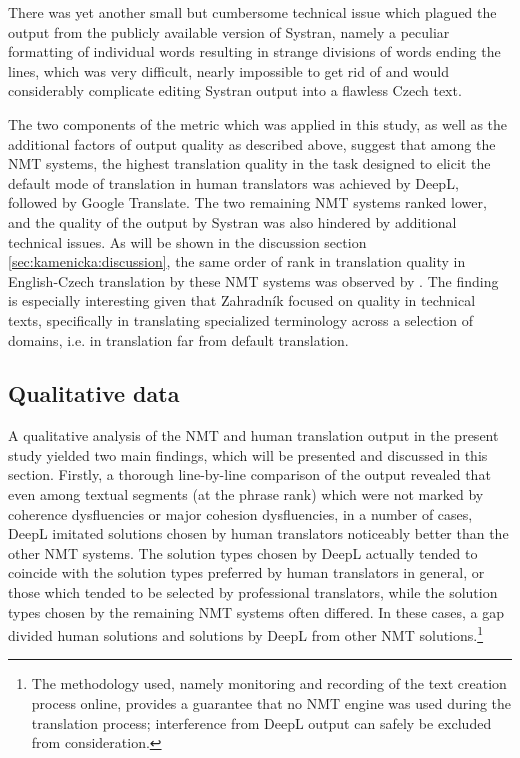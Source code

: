 \documentclass[output=paper]{langscibook}
\begin{document}
There was yet another small but cumbersome technical issue which plagued the output from the publicly available version of Systran, namely a peculiar formatting of individual words resulting in strange divisions of words ending the lines, which was very difficult, nearly impossible to get rid of and would considerably complicate editing Systran output into a flawless Czech text.

The two components of the metric which was applied in this study, as well as the additional factors of output quality as described above, suggest that among the NMT systems, the highest translation quality in the task designed to elicit the default mode of translation in human translators was achieved by DeepL, followed by Google Translate. The two remaining NMT systems ranked lower, and the quality of the output by Systran was also hindered by additional technical issues. As will be shown in the discussion section \ref{sec:kamenicka:discussion}, the same order of rank in translation quality in English{}-Czech translation by these NMT systems was observed by \citet{Zahradník2022}. The finding is especially interesting given that Zahradník focused on quality in technical texts, specifically in translating specialized terminology across a selection of domains, i.e. in translation far from default translation.

\subsection{Qualitative data}\label{sec:kamenicka:4.2}

A qualitative analysis of the NMT and human translation output in the present study yielded two main findings, which will be presented and discussed in this section. Firstly, a thorough line-by-line comparison of the output revealed that even among textual segments (at the phrase rank) which were not marked by coherence dysfluencies or major cohesion dysfluencies, in a number of cases, DeepL imitated solutions chosen by human translators noticeably better than the other NMT systems. The solution types chosen by DeepL actually tended to coincide with the solution types preferred by human translators in general, or those which tended to be selected by professional translators, while the solution types chosen by the remaining NMT systems often differed. In these cases, a gap divided human solutions and solutions by DeepL from other NMT solutions.\footnote{The methodology used, namely monitoring and recording of the text creation process online, provides a guarantee that no NMT engine was used during the translation process; interference from DeepL output can safely be excluded from consideration.}
\end{document}
